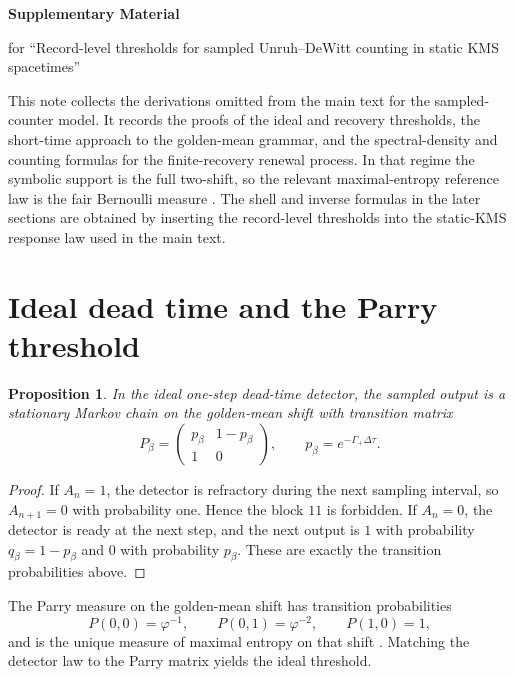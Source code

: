 \documentclass[11pt]{amsart}
\numberwithin{equation}{section}
\newtheorem{proposition}{Proposition}[section]
\theoremstyle{remark}
\begin{document}
\begin{center}
{\LARGE\bfseries Supplementary Material}\par
\vspace{0.5em}
{\large for ``Record-level thresholds for sampled Unruh--DeWitt counting in static KMS spacetimes''}\par
\end{center}

This note collects the derivations omitted from the main text for the sampled-counter model. It records the proofs of the ideal and recovery thresholds, the short-time approach to the golden-mean grammar, and the spectral-density and counting formulas for the finite-recovery renewal process. In that regime the symbolic support is the full two-shift, so the relevant maximal-entropy reference law is the fair Bernoulli measure \cite{LindMarcus1995}. The shell and inverse formulas in the later sections are obtained by inserting the record-level thresholds into the static-KMS response law used in the main text.

\section{Ideal dead time and the Parry threshold}

\begin{proposition}\label{prop:supp-ideal-markov}
In the ideal one-step dead-time detector, the sampled output is a stationary Markov chain on the golden-mean shift with transition matrix
\[
P_\beta=
\begin{pmatrix}
 p_\beta & 1-p_\beta \\
 1 & 0
\end{pmatrix},
\qquad p_\beta=e^{-\Gamma_+\Delta\tau}.
\]
\end{proposition}

\begin{proof}
If $A_n=1$, the detector is refractory during the next sampling interval, so $A_{n+1}=0$ with probability one. Hence the block $11$ is forbidden. If $A_n=0$, the detector is ready at the next step, and the next output is $1$ with probability $q_\beta=1-p_\beta$ and $0$ with probability $p_\beta$. These are exactly the transition probabilities above.
\end{proof}

The Parry measure on the golden-mean shift has transition probabilities
\[
P(0,0)=\varphi^{-1},\qquad P(0,1)=\varphi^{-2},\qquad P(1,0)=1,
\]
and is the unique measure of maximal entropy on that shift \cite{Parry1964,LindMarcus1995}. Matching the detector law to the Parry matrix yields the ideal threshold.
\end{document}
